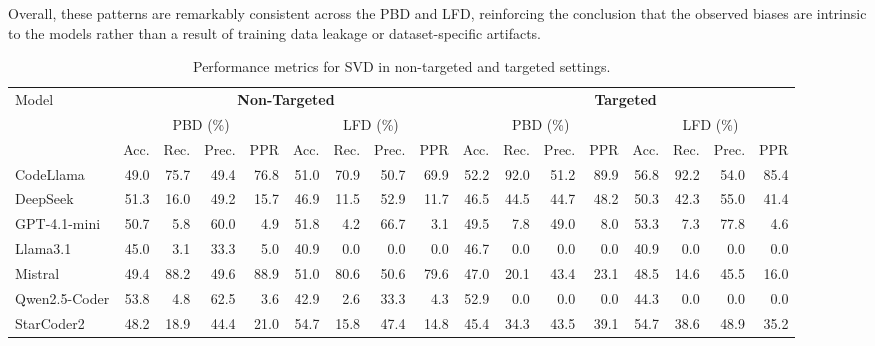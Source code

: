\documentclass[lettersize,journal]{IEEEtran}
\begin{document}
Overall, these patterns are remarkably consistent across the PBD and LFD, reinforcing the conclusion that the observed biases are intrinsic to the models rather than a result of training data leakage or dataset-specific artifacts.



\begin{table}[!t]
    \centering
    \caption{Performance metrics for \gls{SVD} in non-targeted and targeted settings.}
    \label{tab:metrics-svd}
    \scriptsize
    \renewcommand{\arraystretch}{1.0}
    \setlength{\tabcolsep}{1.8pt}
    \begin{tabular}{l rr rr rr rr rr rr rr rr}
    \toprule
    \multirow{3}{*}{Model}
      & \multicolumn{8}{c}{\textbf{Non-Targeted}}
      & \multicolumn{8}{c}{\textbf{Targeted}} \\
    \cmidrule(lr){2-9} \cmidrule(lr){10-17}
      & \multicolumn{4}{c}{PBD (\%)} & \multicolumn{4}{c}{LFD (\%)}
      & \multicolumn{4}{c}{PBD (\%)} & \multicolumn{4}{c}{LFD (\%)} \\
    \cmidrule(lr){2-5} \cmidrule(lr){6-9} \cmidrule(lr){10-13} \cmidrule(lr){14-17}
      & Acc. & Rec. & Prec. & PPR 
      & Acc. & Rec. & Prec. & PPR 
      & Acc. & Rec. & Prec. & PPR 
      & Acc. & Rec. & Prec. & PPR \\
    \midrule
    CodeLlama & 49.0 & 75.7 & 49.4 & 76.8 & 51.0 & 70.9 & 50.7 & 69.9 & 52.2 & 92.0 & 51.2 & 89.9 & 56.8 & 92.2 & 54.0 & 85.4 \\
    DeepSeek & 51.3 & 16.0 & 49.2 & 15.7 & 46.9 & 11.5 & 52.9 & 11.7 & 46.5 & 44.5 & 44.7 & 48.2 & 50.3 & 42.3 & 55.0 & 41.4 \\
    GPT-4.1-mini & 50.7 & 5.8 & 60.0 & 4.9 & 51.8 & 4.2 & 66.7 & 3.1 & 49.5 & 7.8 & 49.0 & 8.0 & 53.3 & 7.3 & 77.8 & 4.6 \\
    Llama3.1 & 45.0 & 3.1 & 33.3 & 5.0 & 40.9 & 0.0 & 0.0 & 0.0 & 46.7 & 0.0 & 0.0 & 0.0 & 40.9 & 0.0 & 0.0 & 0.0 \\
    Mistral & 49.4 & 88.2 & 49.6 & 88.9 & 51.0 & 80.6 & 50.6 & 79.6 & 47.0 & 20.1 & 43.4 & 23.1 & 48.5 & 14.6 & 45.5 & 16.0 \\
    Qwen2.5-Coder & 53.8 & 4.8 & 62.5 & 3.6 & 42.9 & 2.6 & 33.3 & 4.3 & 52.9 & 0.0 & 0.0 & 0.0 & 44.3 & 0.0 & 0.0 & 0.0 \\
    StarCoder2 & 48.2 & 18.9 & 44.4 & 21.0 & 54.7 & 15.8 & 47.4 & 14.8 & 45.4 & 34.3 & 43.5 & 39.1 & 54.7 & 38.6 & 48.9 & 35.2 \\
    \bottomrule
    \end{tabular}
\end{table}
\end{document}
